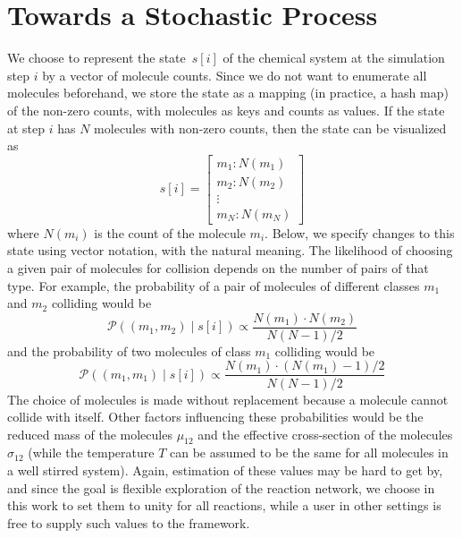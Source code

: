 \section{Towards a Stochastic Process}
\label{stocProcess}

We choose to represent the state~$s[i]$ of the chemical system at the simulation step $i$ by a vector of molecule counts. Since we do not want to enumerate all molecules beforehand, we store the state as a mapping (in practice, a hash map) of the non-zero counts, with molecules as keys and counts as values. If the state at step $i$ has $N$ molecules with non-zero counts, then the state can be visualized as
\begin{equation*}
    s[i] = \begin{bmatrix} m_1\colon N(m_1) \\ m_2\colon N(m_2) \\ \vdots \\ m_N\colon N(m_N) \end{bmatrix}
\end{equation*}
where $N(m_i)$ is the count of the molecule $m_i$. Below, we specify changes to this state using vector notation, with the natural meaning. The likelihood of choosing a given pair of molecules for collision depends on the number of pairs of that type. For example, the probability of a pair of molecules of different classes $m_1$ and $m_2$ colliding would be
\begin{equation}
    \mathcal{P}\left((m_1, m_2)\mid s[i]\right) \propto \frac{N(m_1)\cdot N(m_2)}{N (N-1)/2}
    \label{react_prob_different_molecules}
\end{equation}
and the probability of two molecules of class $m_1$ colliding would be
\begin{equation}
  \mathcal{P}\left((m_1, m_1)\mid s[i]\right) \propto \frac{N(m_1)\cdot(N(m_1)-1)/2}{N (N-1)/2}
      \label{react_prob_same_molecules}
\end{equation}
The choice of molecules is made without replacement because a molecule cannot collide with itself. Other factors influencing these probabilities would be the reduced mass of the molecules $\mu_{12}$ and the effective cross-section of the molecules $\sigma_{12}$ (while the temperature $T$ can be assumed to be the same for all molecules in a well stirred system). Again, estimation of these values may be hard to get by, and since the goal is flexible exploration of the reaction network, we choose in this work to set them to unity for all reactions, while a user in other settings is free to supply such values to the framework.

